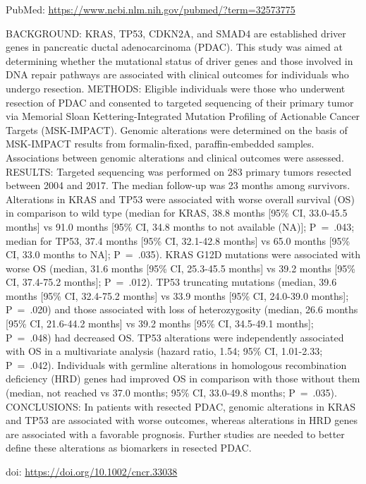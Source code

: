 \documentclass[
]{article}
\begin{document}
PubMed: \url{https://www.ncbi.nlm.nih.gov/pubmed/?term=32573775}

BACKGROUND: KRAS, TP53, CDKN2A, and SMAD4 are established driver genes
in pancreatic ductal adenocarcinoma (PDAC). This study was aimed at
determining whether the mutational status of driver genes and those
involved in DNA repair pathways are associated with clinical outcomes
for individuals who undergo resection. METHODS: Eligible individuals
were those who underwent resection of PDAC and consented to targeted
sequencing of their primary tumor via Memorial Sloan
Kettering-Integrated Mutation Profiling of Actionable Cancer Targets
(MSK-IMPACT). Genomic alterations were determined on the basis of
MSK-IMPACT results from formalin-fixed, paraffin-embedded samples.
Associations between genomic alterations and clinical outcomes were
assessed. RESULTS: Targeted sequencing was performed on 283 primary
tumors resected between 2004 and 2017. The median follow-up was 23
months among survivors. Alterations in KRAS and TP53 were associated
with worse overall survival (OS) in comparison to wild type (median for
KRAS, 38.8 months {[}95\% CI, 33.0-45.5 months{]} vs 91.0 months {[}95\%
CI, 34.8 months to not available (NA){]}; P~=~.043; median for TP53,
37.4 months {[}95\% CI, 32.1-42.8 months{]} vs 65.0 months {[}95\% CI,
33.0 months to NA{]}; P~=~.035). KRAS G12D mutations were associated
with worse OS (median, 31.6 months {[}95\% CI, 25.3-45.5 months{]} vs
39.2 months {[}95\% CI, 37.4-75.2 months{]}; P~=~.012). TP53 truncating
mutations (median, 39.6 months {[}95\% CI, 32.4-75.2 months{]} vs 33.9
months {[}95\% CI, 24.0-39.0 months{]}; P~=~.020) and those associated
with loss of heterozygosity (median, 26.6 months {[}95\% CI, 21.6-44.2
months{]} vs 39.2 months {[}95\% CI, 34.5-49.1 months{]}; P~=~.048) had
decreased OS. TP53 alterations were independently associated with OS in
a multivariate analysis (hazard ratio, 1.54; 95\% CI, 1.01-2.33;
P~=~.042). Individuals with germline alterations in homologous
recombination deficiency (HRD) genes had improved OS in comparison with
those without them (median, not reached vs 37.0 months; 95\% CI,
33.0-49.8 months; P~=~.035). CONCLUSIONS: In patients with resected
PDAC, genomic alterations in KRAS and TP53 are associated with worse
outcomes, whereas alterations in HRD genes are associated with a
favorable prognosis. Further studies are needed to better define these
alterations as biomarkers in resected PDAC.

doi: \url{https://doi.org/10.1002/cncr.33038}
\end{document}
